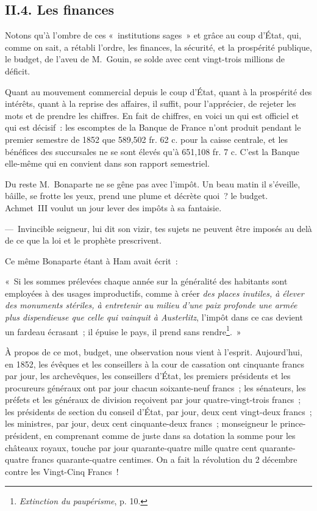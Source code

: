 \documentclass[french,twoside]{book} %
\newenvironment{quoteblock}%
  {\begin{quoting}}
  {\end{quoting}}
\newenvironment{quotebar}{%
    \def\FrameCommand{{\color{rubric!10!}\vrule width 0.5em} \hspace{0.9em}}%
    \def\OuterFrameSep{\itemsep} %
    \MakeFramed {\advance\hsize-\width \FrameRestore}
  }%
  {%
    \endMakeFramed
  }
\renewenvironment{quoteblock}%
  {%
    \savenotes
    \setstretch{0.9}
    \normalfont
    \begin{quotebar}
  }
  {%
    \end{quotebar}
    \spewnotes
  }
\begin{document}
\subsection[{II.4. Les finances}]{II.4. Les finances}
\noindent Notons qu’à l’ombre de ces « institutions sages » et grâce au coup d’État, qui, comme on sait, a rétabli l’ordre, les finances, la sécurité, et la prospérité publique, le budget, de l’aveu de M. Gouin, se solde avec cent vingt-trois millions de déficit.\par
Quant au mouvement commercial depuis le coup d’État, quant à la prospérité des intérêts, quant à la reprise des affaires, il suffit, pour l’apprécier, de rejeter les mots et de prendre les chiffres. En fait de chiffres, en voici un qui est officiel et qui est décisif : les escomptes de la Banque de France n’ont produit pendant le premier semestre de 1852 que 589,502 fr. 62 c. pour la caisse centrale, et les bénéfices des succursales ne se sont élevés qu’à 651,108 fr. 7 c. C’est la Banque elle-même qui en convient dans son rapport semestriel.\par
Du reste M. Bonaparte ne se gêne pas avec l’impôt. Un beau matin il s’éveille, bâille, se frotte les yeux, prend une plume et décrète quoi ? le budget. Achmet III voulut un jour lever des impôts à sa fantaisie.\par
— Invincible seigneur, lui dit son vizir, tes sujets ne peuvent être imposés au delà de ce que la loi et le prophète prescrivent.\par
Ce même Bonaparte étant à Ham avait écrit :\par

\begin{quoteblock}
 \noindent « Si les sommes prélevées chaque année sur la généralité des habitants sont employées à des usages improductifs, comme à créer \emph{des places inutiles, à élever des monuments stériles, à entretenir au milieu d’une paix profonde une armée plus dispendieuse que celle qui vainquit à Austerlitz}, l’impôt dans ce cas devient un fardeau écrasant ; il épuise le pays, il prend sans rendre\footnote{\emph{Extinction du paupérisme}, p. 10.}. »
 \end{quoteblock}

\noindent À propos de ce mot, budget, une observation nous vient à l’esprit. Aujourd’hui, en 1852, les évêques et les conseillers à la cour de cassation ont cinquante francs par jour, les archevêques, les conseillers d’État, les premiers présidents et les procureurs généraux ont par jour chacun soixante-neuf francs ; les sénateurs, les préfets et les généraux de division reçoivent par jour quatre-vingt-trois francs ; les présidents de section du conseil d’État, par jour, deux cent vingt-deux francs ; les ministres, par jour, deux cent cinquante-deux francs ; monseigneur le prince-président, en comprenant comme de juste dans sa dotation la somme pour les châteaux royaux, touche par jour quarante-quatre mille quatre cent quarante-quatre francs quarante-quatre centimes. On a fait la révolution du 2 décembre contre les Vingt-Cinq Francs !
\end{document}
